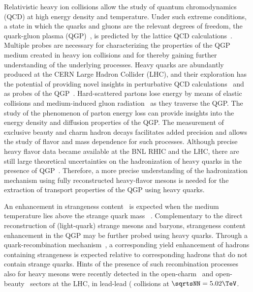Relativistic heavy ion collisions allow the study of quantum chromodynamics (QCD) at high energy density and temperature. Under such extreme conditions, a state in which the quarks and gluons are the relevant degrees of freedom, the quark-gluon plasma (QGP)~\cite{QGP1,QGP2}, is predicted by the lattice QCD calculations~\cite{Karsch:2003jg}.
%
Multiple probes are necessary for characterizing the properties of the QGP medium created in heavy ion collisions and for thereby gaining further understanding of the underlying processes.
%
Heavy quarks are abundantly produced at the CERN Large Hadron Collider (LHC), and their exploration has the potential of providing novel insights in perturbative QCD calculations~\cite{Andronic:2015wma} and as probes of the QGP~\cite{Dong:2019byy}.
%
Hard-scattered partons lose energy by means of elastic collisions and medium-induced gluon radiation~\cite{Eloss1,Baier:2000mf,Chatrchyan:2011sx,Aad:2010bu,Andronic:2015wma} as they traverse the QGP.
The study of the phenomenon of parton energy loss can provide insights into the energy density and diffusion properties of the QGP.
%
The measurement of exclusive beauty and charm hadron decays facilitates added precision and allows the study of flavor and mass dependence for such processes. 
%
Although precise heavy flavor data became available at the BNL RHIC and the LHC, there are still large theoretical uncertainties on the hadronization of heavy quarks in the presence of QGP~\cite{Rapp:2018qla}. Therefore, a more precise understanding of the hadronization mechanism using fully reconstructed heavy-flavor mesons is needed for the extraction of transport properties of the QGP using heavy quarks. 

An enhancement in strangeness content~\cite{ALICE:2017jyt,Abelev:2013xaa,Agakishiev:2011ar,Abelev:2008zk,Arsene:2009jg,Adamczyk:2017wsl,Adare:2015ema} is expected when the medium temperature lies above the strange quark mass ~\cite{PhysRevLett.48.1066}. Complementary to the direct reconstruction of (light-quark) strange mesons and baryons, %
strangeness content enhancement in the QGP may be further probed using heavy quarks.
%
Through a quark-recombination mechanism~\cite{Molnar:2003ff,Greco:2003mm,Greco:2003vf,Andronic:2015wma,He:2014cla}, a corresponding yield enhancement of hadrons containing strangeness is expected relative to corresponding hadrons that do not contain strange quarks. 
%
Hints of the presence of such recombination processes also for heavy mesons were recently detected in the open-charm~\cite{Acharya:2018hre} and open-beauty~\cite{BsPbPbCMS} sectors at the LHC, in lead-lead (\PbPb\) collisions at $\sqrtsNN=5.02\TeV$. 

